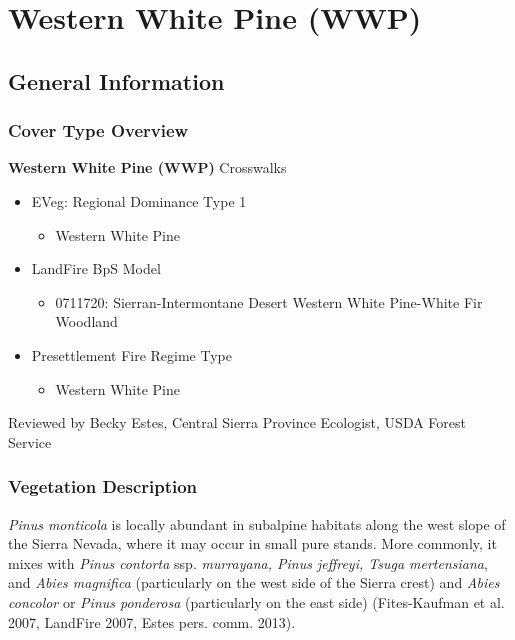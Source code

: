 \newpage
\section{Western White Pine (WWP)}

\subsection*{General Information}

\subsubsection{Cover Type Overview}

\textbf{Western White Pine (WWP)}
\newline
Crosswalks
\begin{itemize}
	\item EVeg: Regional Dominance Type 1
	\begin{itemize}
		\item Western White Pine 
	\end{itemize}

	\item LandFire BpS Model
	\begin{itemize}
		\item 0711720: Sierran-Intermontane Desert Western White Pine-White Fir Woodland
	\end{itemize}

	\item Presettlement Fire Regime Type
	\begin{itemize}
		\item Western White Pine
	\end{itemize}
\end{itemize}

\noindent Reviewed by Becky Estes, Central Sierra Province Ecologist, USDA Forest Service

\subsubsection{Vegetation Description}
\emph{Pinus monticola} is locally abundant in subalpine habitats along the west slope of the Sierra Nevada, where it may occur in small pure stands. More commonly, it mixes with \emph{Pinus contorta} ssp. \emph{murrayana, Pinus jeffreyi, Tsuga mertensiana}, and \emph{Abies magnifica} (particularly on the west side of the Sierra crest) and \emph{Abies concolor} or \emph{Pinus ponderosa} (particularly on the east side) (Fites-Kaufman et al. 2007, LandFire 2007, Estes pers. comm. 2013).

